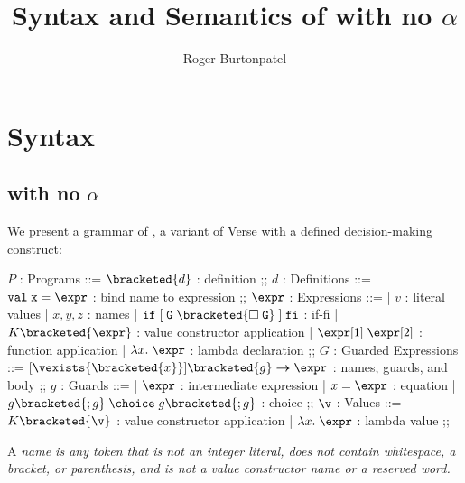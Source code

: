 \documentclass[]{article}
\title{Syntax and Semantics of {\VMinus} with no $\alpha$}
\author{Roger Burtonpatel}
\begin{document}
\maketitle

\section{Syntax}

\subsection{{\VMinus} with no $\alpha$}

We present a grammar of {\VMinus}, a variant of Verse with a defined
decision-making construct: 

\bigskip


\begin{center}
    \begin{bnf}
    $P$ : \textsf{Programs} ::=
    $\bracketed{d}$ : definition
    ;;
    $d$ : \textsf{Definitions} ::=
    | $\tt{val}\; x\; \tt{=}\; \expr$ : bind name to expression
    ;;
    $\expr$ : \textsf{Expressions} ::=
    | $v$ : literal values 
    | $x, y, z$ : names
    | $\tt{if}\; \tt{[}\; G\; \bracketed{\square\; G}\; \tt{]}\; \tt{fi}$ : if-fi 
    | $K \bracketed{\expr}$ : value constructor application 
    | $\expr[1]\; \expr[2]$ : function application 
    | $\lambda x.\; \expr$ : lambda declaration 
    ;;
    $G$ : \textsf{Guarded Expressions} ::=  
    $[\vexists{\bracketed{x}}] \bracketed{g} \boldsymbol{\rightarrow}\expr$ : names, guards, and body
    ;;
    $g$ : \textsf{Guards} ::=  
    | $\expr$ : intermediate expression 
    | $x = \expr$ : equation 
    | $ g \bracketed{; g} \; \choice \; g \bracketed{; g}$ : choice 
    ;;
    $\v$ : Values ::= $K\bracketed{\v}$ : value constructor application 
    | $\lambda x.\; \expr$ : lambda value
    ;;
    \end{bnf}
\end{center}

A \it{name} is any token that is not an integer literal, 
does not contain whitespace, a bracket, or parenthesis, 
and is not a value constructor name or a reserved word.
        
\end{document}
